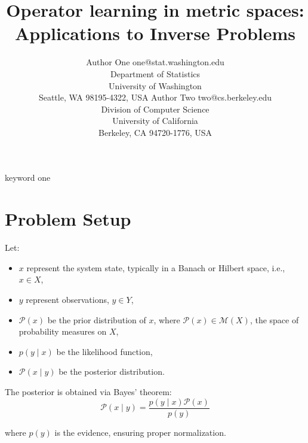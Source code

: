 \documentclass[twoside,11pt]{article}
\begin{document}
\title{Operator learning in metric spaces: Applications to Inverse Problems}

\author{\name Author One \email one@stat.washington.edu \\
       \addr Department of Statistics\\
       University of Washington\\
       Seattle, WA 98195-4322, USA
       \AND
       \name Author Two \email two@cs.berkeley.edu \\
       \addr Division of Computer Science\\
       University of California\\
       Berkeley, CA 94720-1776, USA}


\maketitle

\begin{abstract}%
\end{abstract}

\begin{keywords}
  keyword one
\end{keywords}

\section{Problem Setup}
Let:
\begin{itemize}
    \item \( x \) represent the system state, typically in a Banach or Hilbert space, i.e., \( x \in X \),
    \item \( y \) represent observations, \( y \in Y \),
    \item \( \mathcal{P}(x) \) be the prior distribution of \( x \), where \( \mathcal{P}(x) \in \mathcal{M}(X) \), the space of probability measures on \( X \),
    \item \( p(y \mid x) \) be the likelihood function,
    \item \( \mathcal{P}(x \mid y) \) be the posterior distribution.
\end{itemize}

The posterior is obtained via Bayes' theorem:
\[
\mathcal{P}(x \mid y) = \frac{p(y \mid x) \mathcal{P}(x)}{p(y)}
\]

where \( p(y) \) is the evidence, ensuring proper normalization.
\end{document}
